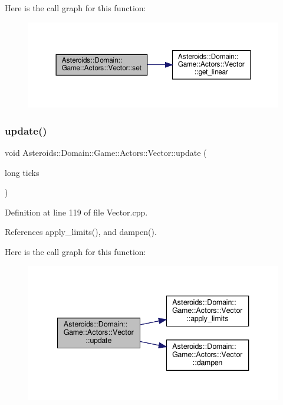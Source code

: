 Here is the call graph for this function\+:\nopagebreak
\begin{figure}[H]
\begin{center}
\leavevmode
\includegraphics[width=350pt]{classAsteroids_1_1Domain_1_1Game_1_1Actors_1_1Vector_a607de2905a1b5e79bc10c15cf4fb0416_cgraph}
\end{center}
\end{figure}
\mbox{\label{classAsteroids_1_1Domain_1_1Game_1_1Actors_1_1Vector_ad5a095932426c3eeea36d6703211dcfc}} 
\subsubsection{\texorpdfstring{update()}{update()}}
{\footnotesize\ttfamily void Asteroids\+::\+Domain\+::\+Game\+::\+Actors\+::\+Vector\+::update (\begin{DoxyParamCaption}\item[{long}]{ticks }\end{DoxyParamCaption})}



Definition at line 119 of file Vector.\+cpp.



References apply\+\_\+limits(), and dampen().

Here is the call graph for this function\+:\nopagebreak
\begin{figure}[H]
\begin{center}
\leavevmode
\includegraphics[width=340pt]{classAsteroids_1_1Domain_1_1Game_1_1Actors_1_1Vector_ad5a095932426c3eeea36d6703211dcfc_cgraph}
\end{center}
\end{figure}


